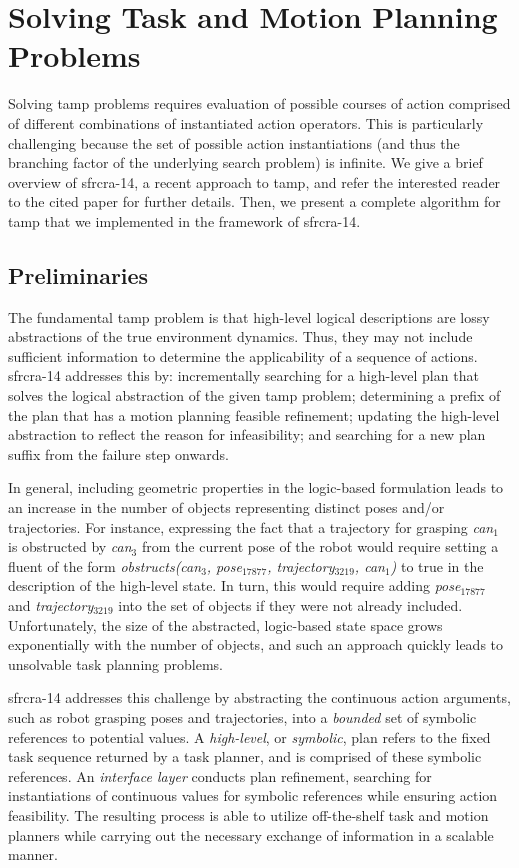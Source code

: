 \section{Solving Task and Motion Planning Problems}
Solving {\sc tamp} problems requires evaluation of
possible courses of action comprised of different combinations of
instantiated action operators. This is particularly challenging
because the set of possible action instantiations (and thus the
branching factor of the underlying search problem) is infinite.
We give a brief overview of {\sc sfrcra-14}, a recent approach to {\sc tamp}, and
refer the interested reader to the cited paper for further details.
Then, we present a complete algorithm for {\sc tamp} that we implemented in
the framework of {\sc sfrcra-14}.

\subsection{Preliminaries}
The fundamental {\sc tamp} problem is that high-level
logical descriptions are lossy abstractions of the true environment
dynamics. Thus, they may not include sufficient information to
determine the applicability of a sequence of actions.
{\sc sfrcra-14} addresses this by: incrementally
searching for a high-level plan that solves the logical abstraction
of the given {\sc tamp} problem; determining a prefix of the plan that has a
motion planning feasible refinement; updating the high-level
abstraction to reflect the reason for infeasibility; and searching for
a new plan suffix from the failure step onwards.

In general, including geometric properties in the logic-based formulation leads to an
increase in the number of objects representing distinct poses and/or trajectories. For
instance, expressing the fact that a trajectory for grasping \emph{can$_1$} is obstructed by
\emph{can$_3$} from the current pose of the robot would require setting a fluent of the
form \emph{obstructs(can$_3$, pose$_{17877}$, trajectory$_{3219}$, can$_1$)} to true in
the description of the high-level state. In turn, this would require adding
\emph{pose$_{17877}$} and \emph{trajectory$_{3219}$} into the set of objects if they were
not already included. Unfortunately, the size of the abstracted, logic-based state space
grows exponentially with the number of objects, and such an approach quickly leads to
unsolvable task planning problems.

{\sc sfrcra-14} addresses this challenge by abstracting the continuous
action arguments, such as robot grasping poses and trajectories, into
a \emph{bounded} set of symbolic references to potential values. A
\emph{high-level}, or \emph{symbolic}, plan refers to the fixed task
sequence returned by a task planner, and is comprised of these symbolic
references. An \emph{interface layer} conducts plan refinement,
searching for instantiations of continuous values for symbolic
references while ensuring action feasibility.  The resulting process
is able to utilize off-the-shelf task and motion planners while
carrying out the necessary exchange of information in a scalable
manner.

